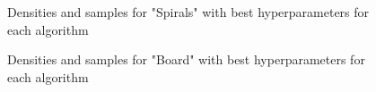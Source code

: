 \begin{figure}[h]
    \centering
    \label{fig:spirals_best}
    \caption{Densities and samples for "Spirals" with best hyperparameters for each algorithm}
\end{figure}

\begin{figure}[h]
    \centering
    \label{fig:board_best}
    \caption{Densities and samples for "Board" with best hyperparameters for each algorithm}
\end{figure}







